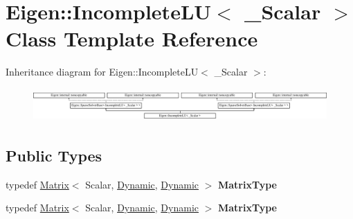 \hypertarget{class_eigen_1_1_incomplete_l_u}{}\section{Eigen\+:\+:Incomplete\+LU$<$ \+\_\+\+Scalar $>$ Class Template Reference}
\label{class_eigen_1_1_incomplete_l_u}
Inheritance diagram for Eigen\+:\+:Incomplete\+LU$<$ \+\_\+\+Scalar $>$\+:\begin{figure}[H]
\begin{center}
\leavevmode
\includegraphics[height=1.272727cm]{class_eigen_1_1_incomplete_l_u}
\end{center}
\end{figure}
\subsection*{Public Types}
\begin{DoxyCompactItemize}
\item 
\mbox{\label{class_eigen_1_1_incomplete_l_u_a42ba0d2b107a17114d5de798f7838cff}} 
typedef \hyperlink{group___core___module_class_eigen_1_1_matrix}{Matrix}$<$ Scalar, \hyperlink{namespace_eigen_ad81fa7195215a0ce30017dfac309f0b2}{Dynamic}, \hyperlink{namespace_eigen_ad81fa7195215a0ce30017dfac309f0b2}{Dynamic} $>$ {\bfseries Matrix\+Type}
\item 
\mbox{\label{class_eigen_1_1_incomplete_l_u_a42ba0d2b107a17114d5de798f7838cff}} 
typedef \hyperlink{group___core___module_class_eigen_1_1_matrix}{Matrix}$<$ Scalar, \hyperlink{namespace_eigen_ad81fa7195215a0ce30017dfac309f0b2}{Dynamic}, \hyperlink{namespace_eigen_ad81fa7195215a0ce30017dfac309f0b2}{Dynamic} $>$ {\bfseries Matrix\+Type}
\end{DoxyCompactItemize}
